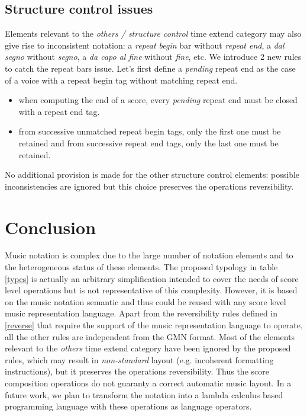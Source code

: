\documentclass[twoside,10pt,a4paper]{article}
\begin{document}
\subsection{Structure control issues} \label{sc}
Elements relevant to the \emph{others / structure control} time extend category may also give rise to inconsistent notation: a \emph{repeat begin} bar without \emph{repeat end}, a \emph{dal segno} without \emph{segno}, a \emph{da capo al fine} without \emph{fine}, etc. We introduce 2 new rules to catch the repeat bars issue. Let's first define a \emph{pending} repeat end as the case of a voice with a repeat begin tag without matching repeat end.
\begin{itemize}
\item when computing the end of a score, every \emph{pending} repeat end must be closed with a repeat end tag.
\item from successive unmatched repeat begin tags, only the first one must be retained and from successive repeat end tags, only the last one must be retained.
\end{itemize}
No additional provision is made for the other structure control elements: possible inconsistencies are ignored but this choice preserves the operations reversibility.

\section{Conclusion}
Music notation is complex due to the large number of notation elements and to the heterogeneous status of these elements. The proposed typology in table \ref{types} is actually an arbitrary simplification intended to cover the needs of score level operations but is not representative of this complexity. However, it is based on the music notation semantic and thus could be reused with any score level music representation language. Apart from the reversibility rules defined in \ref{reverse} that require the support of the music representation language to operate, all the other rules are independent from the GMN format.
Most of the elements relevant to the \emph{others} time extend category have been ignored by the proposed rules, which may result in \emph{non-standard} layout (e.g. incoherent formatting instructions), but it preserves the operations reversibility. Thus the score composition operations do not guaranty a correct automatic music layout. 
In a future work, we plan to transform the notation into a lambda calculus based programming language \cite{Orlarey:94} with these operations as language operators.


\end{document}

